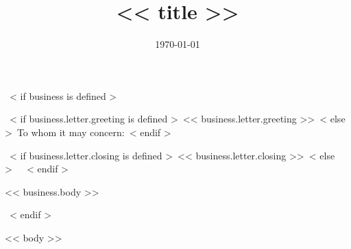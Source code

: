\documentclass[<< theme.font_size >>, << theme.paper_size >>]{moderncv}
\title{<< title >>}
\begin{document}
~< if business is defined >~
\date{\today}
\opening{~< if business.letter.greeting is defined >~<< business.letter.greeting >>~< else >~To whom it may concern:~< endif >~}
\closing{~< if business.letter.closing is defined >~<< business.letter.closing >>~< else >~{\ }~< endif >~}

\makelettertitle            %
<< business.body >>

\makeletterclosing          %
\newpage
\setcounter{page}{1}
\justifying
~< endif >~


\makecvtitle
\vspace{-20pt}

<< body >>
\end{document}
